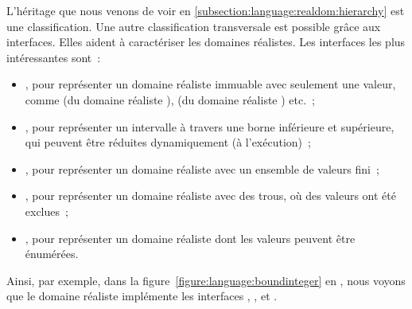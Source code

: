 L'héritage que nous venons de voir en
\ref{subsection:language:realdom:hierarchy} est une classification. Une autre
classification transversale est possible grâce aux interfaces. Elles aident à
caractériser les domaines réalistes. Les interfaces les plus intéressantes
sont~:
%
\begin{itemize}

\item {}, pour représenter un domaine réaliste immuable avec
seulement une valeur, comme  (du domaine réaliste ),
 (du domaine réaliste ) etc.~;

\item {}, pour représenter un intervalle à travers une borne
inférieure et supérieure, qui peuvent être réduites dynamiquement (à
l'exécution)~;

\item {}, pour représenter un domaine réaliste avec un ensemble de
valeurs fini~;

\item {}, pour représenter un domaine réaliste avec des trous, \ie
où des valeurs ont été exclues~;

\item {}, pour représenter un domaine réaliste dont les valeurs
peuvent être énumérées.

\end{itemize}

Ainsi, par exemple, dans la figure~\ref{figure:language:boundinteger} en
, nous voyons que le domaine réaliste  implémente
les interfaces , ,  et
.
